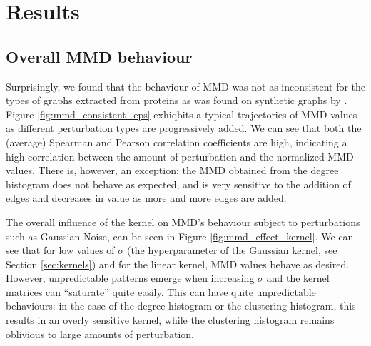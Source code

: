 \chapter{Results}

\section{Overall MMD behaviour}

Surprisingly, we found that the behaviour of MMD was not as inconsistent for the
types of graphs extracted from proteins as was found on synthetic graphs
by \cite{o2021evaluation}. Figure \ref{fig:mmd_consistent_eps} exhiqbits a
typical trajectories of MMD values as different perturbation types are
progressively added. We can see that both the (average) Spearman and Pearson correlation
coefficients are high, indicating a high correlation between the amount of
perturbation and the normalized MMD values. There is, however, an exception: the
MMD obtained from the degree histogram does not behave as expected, and is very sensitive to the
addition of edges and decreases in value as more and more edges are added.

The overall influence of the kernel on MMD's behaviour subject to
perturbations such as Gaussian Noise, can be seen in Figure \ref{fig:mmd_effect_kernel}. We can
see that for low values of $\sigma$ (the hyperparameter of the Gaussian kernel,
see Section \ref{sec:kernels}) and for the linear kernel, MMD values behave as
desired. However, unpredictable patterns emerge when increasing $\sigma$ and the
kernel matrices can ``saturate'' quite easily. This can have quite unpredictable
behaviours: in the case of the degree histogram or the clustering histogram,
this results in an overly sensitive kernel, while the clustering histogram
remains oblivious to large amounts of perturbation.

